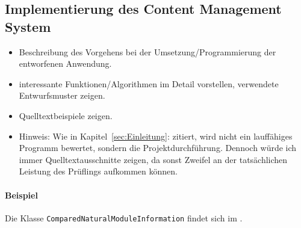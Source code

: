\subsection{Implementierung des Content Management System}
\label{sec:ImplementierungCMS}

\begin{itemize}
	\item Beschreibung des Vorgehens bei der Umsetzung/Programmierung der entworfenen Anwendung.
	\item \Ggfs interessante Funktionen/Algorithmen im Detail vorstellen, verwendete Entwurfsmuster zeigen.
	\item Quelltextbeispiele zeigen.
	\item Hinweis: Wie in Kapitel~\ref{sec:Einleitung}:  zitiert, wird nicht ein lauffähiges Programm bewertet, sondern die Projektdurchführung. Dennoch würde ich immer Quelltextausschnitte zeigen, da sonst Zweifel an der tatsächlichen Leistung des Prüflings aufkommen können.
\end{itemize}

\paragraph{Beispiel}
Die Klasse \texttt{Com\-par\-ed\-Na\-tu\-ral\-Mo\-dule\-In\-for\-ma\-tion} findet sich im .  


